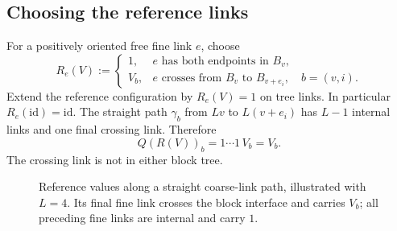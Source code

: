 \documentclass[10pt,reqno]{amsart}
\theoremstyle{definition}
\theoremstyle{remark}
\numberwithin{equation}{section}
\numberwithin{figure}{section}
\newcommand{\id}{\mathrm{id}}
\begin{document}
\subsection{Choosing the reference links}
For a positively oriented free fine link $e$, choose
\begin{equation}\label{eq:straight-reference-links}
R_e(V):=\begin{cases}
1,&e\text{ has both endpoints in }B_v,\\
V_b,&e\text{ crosses from }B_v\text{ to }B_{v+e_i},\quad b=(v,i).
\end{cases}
\end{equation}
Extend the reference configuration by $R_e(V)=1$ on tree links.
In particular $R_e(\id)=\id$. The straight path $\gamma_b$ from $Lv$ to
$L(v+e_i)$ has $L-1$ internal links and one final crossing link. Therefore
\begin{equation}\label{eq:straight-reference-predictor}
Q(R(V))_b=1\cdots1\,V_b=V_b.
\end{equation}
The crossing link is not in either block tree.
\begin{figure}[htbp]
\centering
{}
\caption{Reference values along a straight coarse-link path, illustrated
with $L=4$. Its final fine link crosses the block interface and carries
$V_b$; all preceding fine links are internal and carry $1$.}
\label{fig:straight-reference-values}
\end{figure}
\end{document}
